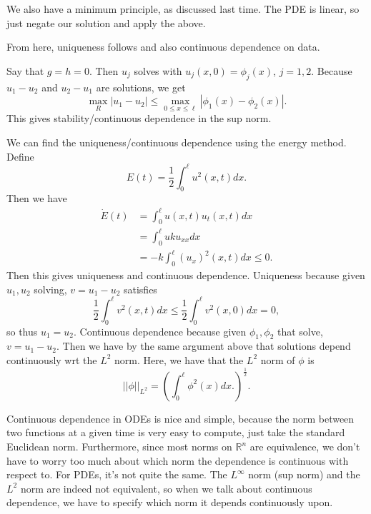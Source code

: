 \begin{remark}
	We also have a minimum principle, as discussed last time. The PDE is linear, so just negate our solution and apply the above.
\end{remark}

From here, uniqueness follows and also continuous dependence on data.

Say that \( g = h = 0 \). Then \( u_{j} \) solves with \( u_{j}(x, 0) = \phi_{j}(x) \), \( j = 1, 2 \). Because \( u_{1} - u_{2} \) and \( u_{2} - u_{1} \) are solutions, we get
\[ \max_{R} |u_{1} - u_{2}| \le \max_{0 \le x \le \ell} | \phi_{1}(x) - \phi_{2}(x)|. \]
This gives stability/continuous dependence in the sup norm.

\begin{proposition}
	We can find the uniqueness/continuous dependence using the energy method. Define
	\[ E(t) = \frac{1}{2} \int_{0}^{\ell} u^{2}(x, t) dx. \]
	Then we have
	\begin{align*}
		\dot{E}(t) &= \int_{0}^{\ell} u(x, t) u_{t}(x, t) dx
						\\ &= \int_{0}^{\ell}  u k u_{x x} dx \\
							&= -k \int_{0}^{\ell}  (u_{x})^{2}(x, t) dx \le 0.
	\end{align*}
	Then this gives uniqueness and continuous dependence. Uniqueness because given \( u_{1}, u_{2} \) solving, \( v = u_{1} - u_{2} \) satisfies
	\[ \frac{1}{2} \int_{0}^{\ell} v^{2}(x, t) dx \le \frac{1}{2} \int_{0}^{\ell} v^{2}(x, 0) dx = 0,  \]
	so thus \( u_{1} = u_{2} \). Continuous dependence because given \( \phi_{1}, \phi_{2} \) that solve, \( v= u_{1} - u_{2} \). Then we have by the same argument above that solutions depend continuously wrt the \( L^{2} \) norm. Here, we have that the \( L^{2} \) norm of \( \phi \) is
	\[ || \phi||_{L^{2}} = \left( \int_{0}^{\ell} \phi^{2}(x) dx. \right)^{\frac{1}{2}}. \]

	\begin{remark}
		Continuous dependence in ODEs is nice and simple, because the norm between two functions at a given time is very easy to compute, just take the standard Euclidean norm. Furthermore, since most norms on \( \mathbb{R}^{n} \) are equivalence, we don't have to worry too much about which norm the dependence is continuous with respect to. For PDEs, it's not quite the same. The \( L^{\infty} \) norm (sup norm) and the \( L^{2} \) norm are indeed not equivalent, so when we talk about continuous dependence, we have to specify which norm it depends continuously upon.
	\end{remark}
\end{proposition}

